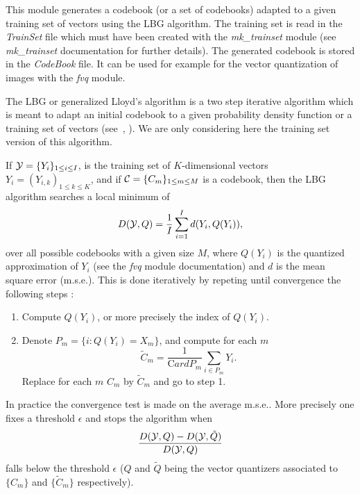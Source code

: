 This module generates a codebook (or a set of codebooks) adapted to a given 
training set of vectors using the LBG algorithm. 
The training set is read in the {\em TrainSet} file which must have been created with 
the {\em mk\_trainset} module (see {\em mk\_trainset} documentation for 
further details). The generated codebook is stored in the {\em CodeBook} 
file. It can be used for example for the vector quantization of images 
with the {\em fvq} module. 

The LBG or generalized Lloyd's algorithm is a two step iterative algorithm 
which is meant to adapt an initial codebook to a given probability 
density function or a training set of vectors (see~\cite{gersho.gray:vector}, 
\cite{linde.buzo.ea:algorithm}). We are only considering here the training set version 
of this algorithm.

If ${\cal Y} = \{Y_i\}_{1\leq i\leq I}$, is the training set of 
$K$-dimensional vectors $Y_i=(Y_{i,k})_{1\leq k\leq K}$, and if 
${\cal C} = \{C_m\}_{1\leq m\leq M}$ is a codebook, then the LBG algorithm 
searches a local minimum of 
\[
D({\cal Y}, Q) = \frac{1}{I} \sum_{i=1}^I d(Y_i, Q(Y_i)),
\]
over all possible codebooks with a given size $M$, 
where $Q(Y_i)$ is the quantized approximation of $Y_i$ (see the {\em fvq} 
module documentation) and $d$ is the mean square error (m.s.e.). 
This is done iteratively by repeting until convergence the following steps : 
\begin{enumerate}
\item
Compute $Q(Y_i)$, or more precisely the index of $Q(Y_i)$. 
\item
Denote $P_m=\{i : Q(Y_i) = X_m\}$, and compute for each $m$ 
\[
\tilde{C}_m = \frac{1}{{\mathrm Card} P_m} \sum_{i\in P_m} Y_i.
\]
Replace for each $m$ $C_m$ by $\tilde{C}_m$ and go to step 1.
\end{enumerate}
In practice the convergence test is made on the average m.s.e.. 
More precisely one fixes a threshold $\epsilon$ and stops the algorithm 
when 
\[
\frac{D({\cal Y}, Q) - D({\cal Y}, \tilde{Q})}{D({\cal Y}, Q)}
\]
falls below the threshold $\epsilon$ ($Q$ and $\tilde{Q}$ being the vector 
quantizers associated to $\{C_m\}$ and $\{\tilde{C}_m\}$ respectively). 

